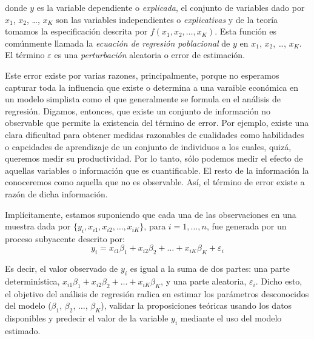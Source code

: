 \documentclass[
  a4paper,
]{article}
\begin{document}
donde \(y\) es la variable dependiente o \emph{explicada}, el conjunto
de variables dado por \(x_1\), \(x_2\), \ldots, \(x_K\) son las
variables independientes o \emph{explicativas} y de la teoría tomamos la
especificación descrita por \(f(x_1, x_2, \ldots, x_K)\). Esta función
es comúnmente llamada la \emph{ecuación de regresión poblacional} de
\(y\) en \(x_1\), \(x_2\), \ldots, \(x_K\). El término \(\varepsilon\)
es una \emph{perturbación} aleatoria o error de estimación.

Este error existe por varias razones, principalmente, porque no
esperamos capturar toda la influencia que existe o determina a una
varaible económica en un modelo simplista como el que generalmente se
formula en el análisis de regresión. Digamos, entonces, que existe un
conjunto de información no observable que permite la existencia del
término de error. Por ejemplo, existe una clara dificultad para obtener
medidas razonables de cualidades como habilidades o capcidades de
aprendizaje de un conjunto de individuos a los cuales, quizá, queremos
medir su productividad. Por lo tanto, sólo podemos medir el efecto de
aquellas variables o información que es cuantificable. El resto de la
información la conoceremos como aquella que no es observable. Así, el
término de error existe a razón de dicha información.

Implícitamente, estamos suponiendo que cada una de las observaciones en
una muestra dada por \(\{y_i, x_{i1}, x_{i2}, \ldots, x_{iK} \}\), para
\(i = 1, \ldots, n\), fue generada por un proceso subyacente descrito
por: \[
    y_i = x_{i1}\beta_1 + x_{i2}\beta_2 + \ldots + x_{iK}\beta_K + \varepsilon_i
\]

Es decir, el valor observado de \(y_i\) es igual a la suma de dos
partes: una parte determinística,
\(x_{i1}\beta_1 + x_{i2}\beta_2 + \ldots + x_{iK}\beta_K\), y una parte
aleatoria, \(\varepsilon_i\). Dicho esto, el objetivo del análisis de
regresión radica en estimar los parámetros desconocidos del modelo
(\(\beta_1\), \(\beta_2\), \(\ldots\), \(\beta_K\)), validar la
proposiciones teóricas usando los datos disponibles y predecir el valor
de la variable \(y_i\) mediante el uso del modelo estimado.
\end{document}
